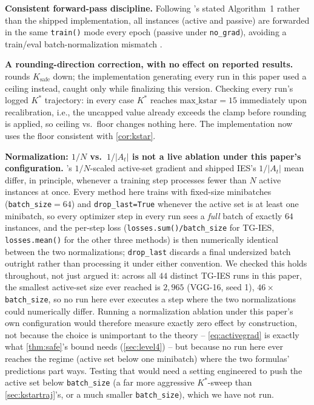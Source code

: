 \documentclass{article}
\theoremstyle{plain}
\theoremstyle{definition}
\theoremstyle{remark}
\begin{document}
\textbf{Consistent forward-pass discipline.} Following \citet{yuan2025instance}'s stated Algorithm~1 rather than the shipped implementation, all instances (active and passive) are forwarded in the same \texttt{train()} mode every epoch (passive under \texttt{no\_grad}), avoiding a train/eval batch-normalization mismatch \citep{ioffe2015batch}.

\textbf{A rounding-direction correction, with no effect on reported results.}  rounds $K_{\mathrm{safe}}$ down; the implementation generating every run in this paper used a ceiling instead, caught only while finalizing this version. Checking every run's logged $K^*$ trajectory: in every case $K^*$ reaches $\mathrm{max\_kstar}=15$ immediately upon recalibration, i.e., the uncapped value already exceeds the clamp before rounding is applied, so ceiling vs.\ floor changes nothing here. The implementation now uses the floor consistent with \cref{cor:kstar}.

\textbf{Normalization: $1/N$ vs.\ $1/|A_t|$ is not a live ablation under this paper's configuration.} 's $1/N$-scaled active-set gradient and shipped IES's $1/|A_t|$ mean differ, in principle, whenever a training step processes fewer than $N$ active instances at once. Every method here trains with fixed-size minibatches (\texttt{batch\_size}$=64$) and \texttt{drop\_last=True} whenever the active set is at least one minibatch, so every optimizer step in every run sees a \emph{full} batch of exactly $64$ instances, and the per-step loss (\texttt{losses.sum()/batch\_size} for TG-IES, \texttt{losses.mean()} for the other three methods) is then numerically identical between the two normalizations; \texttt{drop\_last} discards a final undersized batch outright rather than processing it under either convention. We checked this holds throughout, not just argued it: across all $44$ distinct TG-IES runs in this paper, the smallest active-set size ever reached is $2{,}965$ (VGG-16, seed 1), $46\times$ \texttt{batch\_size}, so no run here ever executes a step where the two normalizations could numerically differ. Running a normalization ablation under this paper's own configuration would therefore measure exactly zero effect by construction, not because the choice is unimportant to the theory -- \cref{eq:activegrad} is exactly what \cref{thm:safe}'s bound needs (\cref{sec:level4}) -- but because no run here ever reaches the regime (active set below one minibatch) where the two formulas' predictions part ways. Testing that would need a setting engineered to push the active set below \texttt{batch\_size} (a far more aggressive $K^*$-sweep than \cref{sec:kstartraj}'s, or a much smaller \texttt{batch\_size}), which we have not run.
\end{document}
